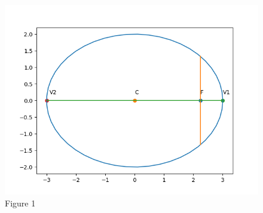 \documentclass[journal,12pt,twocolumn]{IEEEtran}
\begin{document}
\begin{figure}[h!]
  \centering
    \includegraphics[width=\columnwidth]{figs/Figure_1.png}
    \caption{Figure 1}
    \label{fig:}
\end{figure}
\end{document}
